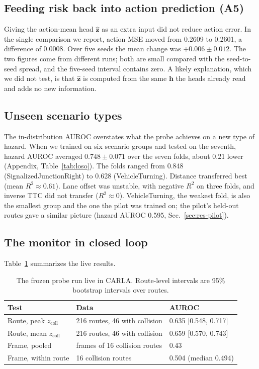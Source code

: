 \documentclass[conference]{IEEEtran}
\newcommand{\zcoll}{z_{\mathrm{coll}}}
\begin{document}
\subsection{Feeding risk back into action prediction (A5)}

Giving the action-mean head $\hat{\mathbf{z}}$ as an extra input did not reduce
action error. In the single comparison we report, action MSE moved from 0.2609 to
0.2601, a difference of 0.0008. Over five seeds the mean change was
$+0.006\pm0.012$. The two figures come from different runs; both are small
compared with the seed-to-seed spread, and the five-seed interval contains zero. A
likely explanation, which we did not test, is that $\hat{\mathbf{z}}$ is computed
from the same $\mathbf{h}$ the heads already read and adds no new information.

\subsection{Unseen scenario types}

The in-distribution AUROC overstates what the probe achieves on a new type of
hazard. When we trained on six scenario groups and tested on the seventh, hazard
AUROC averaged $0.748\pm0.071$ over the seven folds, about 0.21 lower (Appendix,
Table~\ref{tab:loso}). The folds ranged from 0.848 (SignalizedJunctionRight) to
0.628 (VehicleTurning). Distance transferred best (mean $R^2\approx0.61$). Lane
offset was unstable, with negative $R^2$ on three folds, and inverse TTC did not
transfer ($R^2\approx0$). VehicleTurning, the weakest fold, is also the smallest
group and the one the pilot was trained on; the pilot's held-out routes gave a
similar picture (hazard AUROC 0.595, Sec.~\ref{sec:res-pilot}).

\subsection{The monitor in closed loop}
\label{sec:res-online}

Table~\ref{tab:online} summarizes the live results.

\begin{table}[t]
\centering
\caption{The frozen probe run live in CARLA. Route-level intervals are 95\%
bootstrap intervals over routes.}
\label{tab:online}
\footnotesize
\setlength{\tabcolsep}{3pt}
\begin{tabular}{@{}l l l@{}}
\toprule
Test & Data & AUROC \\
\midrule
Route, peak $\zcoll$ & 216 routes, 46 with collision & 0.635 [0.548, 0.717] \\
Route, mean $\zcoll$ & 216 routes, 46 with collision & 0.659 [0.570, 0.743] \\
Frame, pooled & frames of 16 collision routes & 0.43 \\
Frame, within route & 16 collision routes & 0.504 (median 0.494) \\
\bottomrule
\end{tabular}
\end{table}
\end{document}
